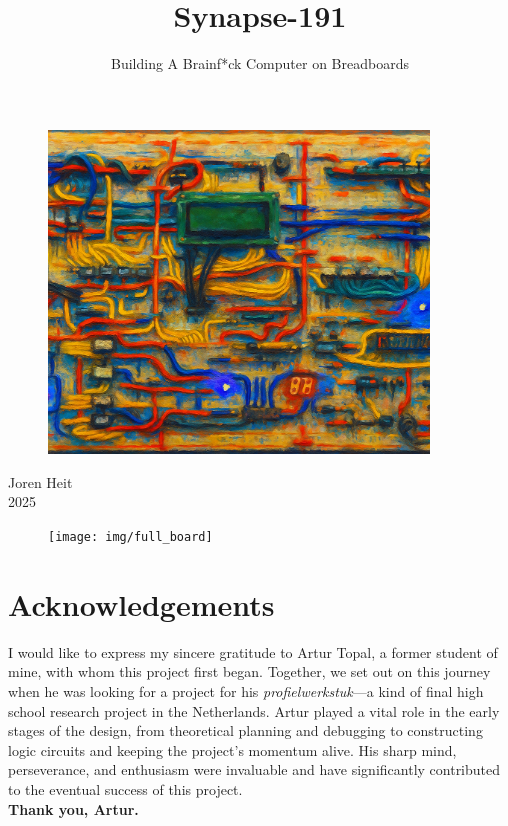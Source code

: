 \documentclass{article}
\title{Synapse-191}
\subtitle{Building A Brainf*ck Computer on Breadboards}
\author{}
\date{}
\makeatletter
\renewcommand{\maketitle}{
  \begin{center}
    {\Huge\bfseries \@title \par}      %
    \vspace{0.5cm}
    {\large\itshape \@subtitle \par}   %
  \end{center}
}
\makeatother
\begin{document}
\thispagestyle{empty}
\maketitle
\vspace{3cm}
\begin{figure}[H]
  \centering
  \includegraphics[width=0.9\textwidth]{img/titlepage_img1}
\end{figure}
\vfill
\begin{flushright}
  {\large Joren Heit}\\[0.3em]
  {\normalsize 2025}
\end{flushright}

\newpage

\mbox{}
\vfill
\begin{figure}[H]
  \centering
  \texttt{[image: img/full\_board]}
\end{figure}
\vfill

\section*{Acknowledgements}
I would like to express my sincere gratitude to Artur Topal, a former student of mine, with whom this project first began. Together, we set out on this journey when he was looking for a project for his \textit{profielwerkstuk}---a kind of final high school research project in the Netherlands. Artur played a vital role in the early stages of the design, from theoretical planning and debugging to constructing logic circuits and keeping the project’s momentum alive. His sharp mind, perseverance, and enthusiasm were invaluable and have significantly contributed to the eventual success of this project.\\[1em]
\textbf{Thank you, Artur.}
\newpage

\tableofcontents
\newpage








\newpage 
\newpage             
\end{document}
